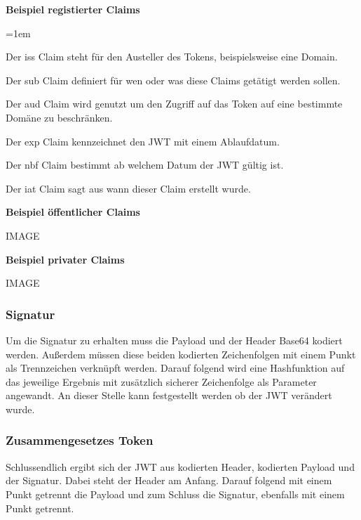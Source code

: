 \documentclass[11pt]{article}
\begin{document}
\begin{flushleft}
			\textbf{Beispiel registierter Claims}

			\begin{description}
				\leftskip=1em
				\item[iss]
				Der iss Claim steht für den Austeller des Tokens, beispielsweise eine Domain.
				\item[sub] Der sub Claim definiert für wen oder was diese Claims getätigt werden sollen.
				\item[aud] Der aud Claim wird genutzt um den Zugriff auf das Token auf eine bestimmte Domäne zu beschränken.
				\item[exp] Der exp Claim kennzeichnet den JWT mit einem Ablaufdatum.
				\item[nbf] Der nbf Claim bestimmt ab welchem Datum der JWT gültig ist.
				\item[iat] Der iat Claim sagt aus wann dieser Claim erstellt wurde.
                        \end{description}


			\textbf{Beispiel öffentlicher Claims}

			IMAGE\par\bigskip


			\textbf{Beispiel privater Claims}

			IMAGE\par\bigskip


			\subsubsection{Signatur}
			\label{sec: jwt_signature}

			Um die Signatur zu erhalten muss die Payload und der Header Base64 kodiert werden. Außerdem müssen diese beiden kodierten Zeichenfolgen mit einem Punkt als Trennzeichen verknüpft werden. Darauf folgend wird eine Hashfunktion auf das jeweilige Ergebnis mit zusätzlich sicherer Zeichenfolge als Parameter angewandt. An dieser Stelle kann festgestellt werden ob der JWT verändert wurde. \par\bigskip


			\subsubsection{Zusammengesetzes Token}
			\label{sec: jwt_result}
			Schlussendlich ergibt sich der JWT aus kodierten Header, kodierten Payload und der Signatur. Dabei steht der Header am Anfang. Darauf folgend mit einem Punkt getrennt die Payload und zum Schluss die Signatur, ebenfalls mit einem Punkt getrennt. \par\bigskip


\end{flushleft}
\end{document}
